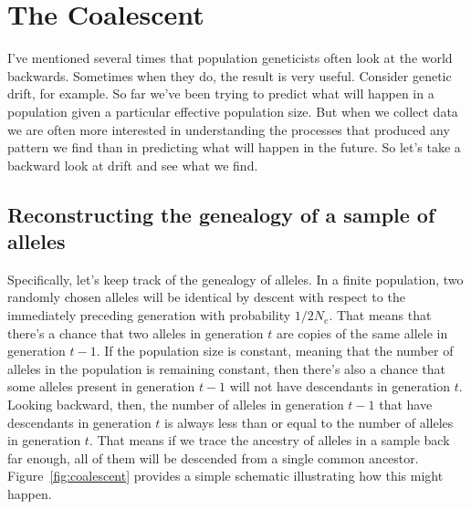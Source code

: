 \chapter{The Coalescent}

I've mentioned several times that population geneticists often look at
the world backwards. Sometimes when they do, the result is very
useful. Consider genetic drift, for example. So far we've been trying
to predict what will happen in a population given a particular
effective population size. But when we collect data we are often more
interested in understanding the processes that produced any pattern we
find than in predicting what will happen in the future. So let's take
a backward look at drift and see what we find.


\section*{Reconstructing the genealogy of a sample of
  alleles}

Specifically, let's keep track of the genealogy of alleles. In a
finite population, two randomly chosen alleles will be identical by
descent with respect to the immediately preceding generation with
probability $1/2N_e$. That means that there's a chance that two
alleles in generation $t$ are copies of the same allele in generation
$t-1$. If the population size is constant, meaning that the number of
alleles in the population is remaining constant, then there's also a
chance that some alleles present in generation $t-1$ will not have
descendants in generation $t$. Looking backward, then, the number of
alleles in generation $t-1$ that have descendants in generation $t$ is
always less than or equal to the number of alleles in generation
$t$. That means if we trace the ancestry of alleles in a sample back
far enough, all of them will be descended from a single common
ancestor. Figure~\ref{fig:coalescent} provides a simple schematic
illustrating how this might happen.

